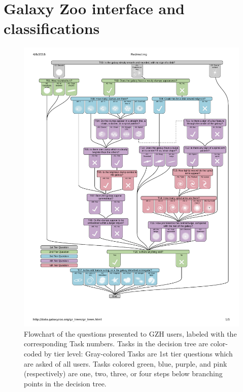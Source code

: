 \documentclass[twocolumn]{aastex6}
\begin{document}
\section{Galaxy Zoo interface and classifications}\label{sec:interface}

\begin{figure}
\center
\includegraphics[width=\textwidth]{figures/gzh_decision_tree.pdf}
\caption{Flowchart of the questions presented to GZH users, labeled with the corresponding Task numbers. Tasks in the decision tree are color-coded by tier level: Gray-colored Tasks are 1st tier questions which are asked of all users. Tasks colored green, blue, purple, and pink (respectively) are one, two, three, or four steps below branching points in the decision tree.}
\label{fig:decisiontree}
\end{figure}
\end{document}
